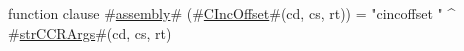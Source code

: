function clause #\hyperref[sailMIPSzassembly]{assembly}# (#\hyperref[sailMIPSzCIncOffset]{CIncOffset}#(cd, cs, rt)) = "cincoffset " ^ #\hyperref[sailMIPSzstrCCRArgs]{strCCRArgs}#(cd, cs, rt)
